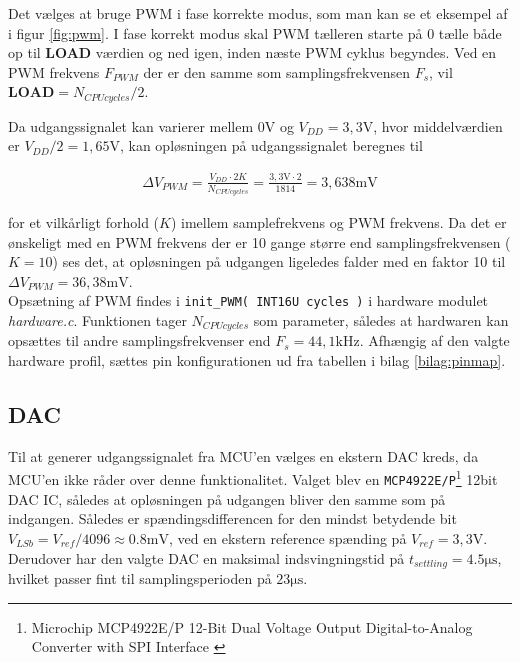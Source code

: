 Det vælges at bruge PWM i fase korrekte modus, som man kan se et eksempel af i figur \ref{fig:pwm}.
I fase korrekt modus skal PWM tælleren starte på 0 tælle både op til \textbf{LOAD} værdien og ned igen, inden næste PWM cyklus begyndes.
Ved en PWM frekvens $F_{PWM}$ der er den samme som samplingsfrekvensen $F_s$, vil $\textbf{LOAD} = N_{CPU cycles} / 2$.

Da udgangssignalet kan varierer mellem $ 0 \si{\volt}$ og $V_{DD} = 3,3 \si{\volt}$, hvor middelværdien er $V_{DD}/2 = 1,65 \si{\volt}$, kan opløsningen på udgangssignalet beregnes til 

\begin{align}
\Delta V_{PWM} = \frac{V_{DD} \cdot 2K}{N_{CPU cycles}} = \frac{3,3\si{\volt} \cdot 2}{1814} =  3,638\si{\milli\volt}
\end{align}

for et vilkårligt forhold ($K$) imellem samplefrekvens og PWM frekvens. 
Da det er ønskeligt med en PWM frekvens der er 10 gange større end samplingsfrekvensen ($K=10$) ses det, at opløsningen på udgangen ligeledes falder med en faktor 10 til $\Delta V_{PWM} = 36,38\si{\milli\volt}$.\\

Opsætning af PWM findes i \texttt{init\_PWM( INT16U cycles )} i hardware modulet \textit{hardware.c}. Funktionen tager $N_{CPU cycles}$ som parameter, således at hardwaren kan opsættes til andre samplingsfrekvenser end $F_s = 44,1\si{\kilo\hertz}$.
Afhængig af den valgte hardware profil, sættes pin konfigurationen ud fra tabellen i bilag \ref{bilag:pinmap}.  

\FloatBlock

\subsection{DAC}
Til at generer udgangssignalet fra MCU'en vælges en ekstern DAC kreds, da MCU'en ikke råder over denne funktionalitet.
Valget blev en \texttt{MCP4922E/P}\footnote{Microchip MCP4922E/P 12-Bit Dual Voltage Output Digital-to-Analog Converter with SPI Interface \cite{mcp4922} } 12bit DAC IC, således at opløsningen på udgangen bliver den samme som på indgangen.
Således er spændingsdifferencen for den mindst betydende bit $ V_{LSb} = V_{ref} / 4096 \approx \num{0,8}\si{\milli\volt} $, ved en ekstern reference spænding på $V_{ref} = 3,3\si{\volt}$.
Derudover har den valgte DAC en maksimal indsvingningstid på $t_{settling} = \num{4.5}\si{\micro\second}$, hvilket passer fint til samplingsperioden på $23\si{\micro\second}$. 

